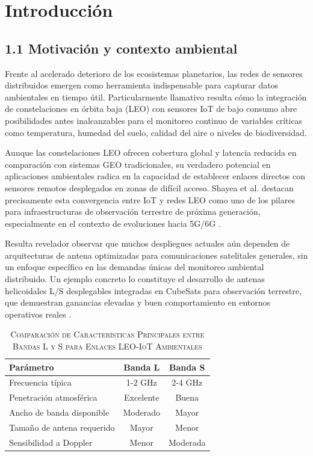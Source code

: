 \section{Introducción}

\subsection{1.1 Motivación y contexto ambiental}

Frente al acelerado deterioro de los ecosistemas planetarios, las redes de sensores distribuidos emergen como herramienta indispensable para capturar datos ambientales en tiempo útil. Particularmente llamativo resulta cómo la integración de constelaciones en órbita baja (LEO) con sensores IoT de bajo consumo abre posibilidades antes inalcanzables para el monitoreo continuo de variables críticas como temperatura, humedad del suelo, calidad del aire o niveles de biodiversidad. 

Aunque las constelaciones LEO ofrecen cobertura global y latencia reducida en comparación con sistemas GEO tradicionales, su verdadero potencial en aplicaciones ambientales radica en la capacidad de establecer enlaces directos con sensores remotos desplegados en zonas de difícil acceso. Shayea et al. destacan precisamente esta convergencia entre IoT y redes LEO como uno de los pilares para infraestructuras de observación terrestre de próxima generación, especialmente en el contexto de evoluciones hacia 5G/6G \cite{Shayea2024}. 

Resulta revelador observar que muchos despliegues actuales aún dependen de arquitecturas de antena optimizadas para comunicaciones satelitales generales, sin un enfoque específico en las demandas únicas del monitoreo ambiental distribuido. Un ejemplo concreto lo constituye el desarrollo de antenas helicoidales L/S desplegables integradas en CubeSats para observación terrestre, que demuestran ganancias elevadas y buen comportamiento en entornos operativos reales \cite{Meirambekuly2023}.

\begin{table}[htbp]
\renewcommand{\arraystretch}{1.3} %
\centering
\caption{\textsc{Comparación de Características Principales entre Bandas L y S para Enlaces LEO-IoT Ambientales}}
\label{tab:bandas_l_s}
\begin{tabularx}{\columnwidth}{|X|c|c|}
\hline
\textbf{Parámetro} & \textbf{Banda L} & \textbf{Banda S} \\ \hline
Frecuencia típica & 1-2 GHz & 2-4 GHz \\ \hline
Penetración atmosférica & Excelente & Buena \\ \hline
Ancho de banda disponible & Moderado & Mayor \\ \hline
Tamaño de antena requerido & Mayor & Menor \\ \hline
Sensibilidad a Doppler & Menor & Moderada \\ \hline
\end{tabularx}
\end{table}

